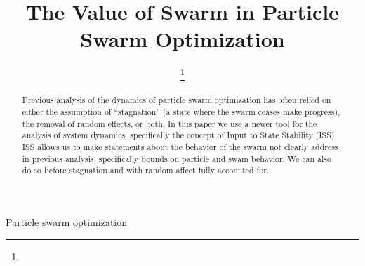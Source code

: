 \documentclass[journal]{IEEEtran}
\begin{document}
\title{The Value of Swarm in Particle Swarm Optimization}

\author{

\thanks{}
}

\markboth{}{}

\maketitle

\begin{abstract}
Previous analysis of the dynamics of particle swarm optimization has often relied on either the assumption of ``stagnation'' (a state where the swarm ceases make progress), the removal of random effects, or both.
In this paper we use a newer tool for the analysis of system dynamics, specifically the concept of Input to State Stability (ISS).
ISS allows us to make statements about the behavior of the swarm not clearly address in previous analysis, specifically bounds on particle and swam behavior.
We can also do so before stagnation and with random affect fully accounted for. 
\end{abstract}

\begin{IEEEkeywords}
Particle swarm optimization
\end{IEEEkeywords}

\IEEEpeerreviewmaketitle

















\end{document}
